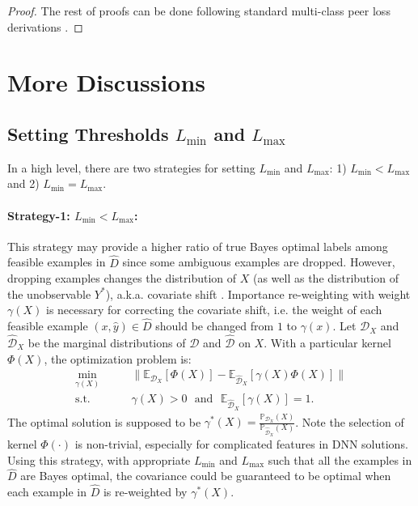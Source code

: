 \documentclass[final]{cvpr}
\newcommand{\estD}{{\hat D}}
\newcommand{\estDis}{{\hat {\mathcal D}}}
\newcommand{\PP}{\mathbb P}
\newcommand{\E}{\mathbb E}
\begin{document}
\begin{proof}
The rest of proofs can be done following standard multi-class peer loss derivations \cite{liu2019peer}. 

\end{proof}

\section{More Discussions}

\subsection{Setting Thresholds $L_{\min}$ and $L_{\max}$}\label{dis:L}

In a high level, there are two strategies for setting $L_{\min}$ and $L_{\max}$: {1) $L_{\min} < L_{\max}$ and 2) $L_{\min} = L_{\max}$}.


\paragraph{Strategy-1: $L_{\min} < L_{\max}$:}
This strategy may provide a higher ratio of true Bayes optimal labels among feasible examples in $\estD$ since some ambiguous examples are dropped. However, dropping examples changes the distribution of $X$ (as well as the distribution of the unobservable $Y^*$), a.k.a. covariate shift \cite{huang2007correcting,cheng2017learningdistill}. 
Importance re-weighting with weight $\gamma(X)$ is necessary for correcting the covariate shift, i.e. the weight of each feasible example $(x,\hat y)\in\estD$ should be changed from $1$ to $\gamma(x)$.
Let $\mathcal D_X$ and $\hat{\mathcal D}_X$ be the marginal distributions of $\mathcal{D}$ and $\estDis$ on $X$.
With a particular kernel $\Phi(X)$, the optimization problem is:
\begin{equation}
\label{eq:opt_gamma}
    \begin{split}
            \min_{\gamma(X)}& \qquad \| \E_{\mathcal D_X} [\Phi(X)] - \E_{\hat{\mathcal D}_{X}} [\gamma(X)\Phi(X)]\| \\
    \text{s.t.} & \qquad\gamma(X) > 0 \text{~~and~~} \E_{\hat{\mathcal D}_{X}}[\gamma(X)] = 1.
    \end{split}
\end{equation}
The optimal solution is supposed to be $\gamma^*(X)=\frac{\PP_{{\mathcal D}_X}(X)}{\PP_{\hat{\mathcal D}_X}(X)}$.
Note the selection of kernel $\Phi(\cdot)$ is non-trivial, especially for complicated features \cite{fang2020rethinking} in DNN solutions.
Using this strategy, with appropriate $L_{\min}$ and $L_{\max}$ such that all the examples in $\estD$ are Bayes optimal, the covariance could be guaranteed to be optimal when each example in $\estD$ is re-weighted by $\gamma^*(X)$. 
\end{document}
